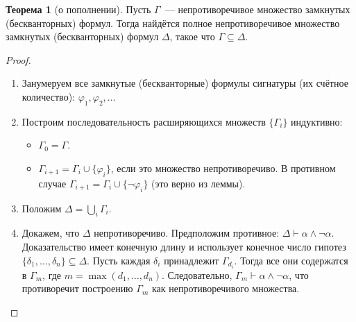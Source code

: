 \documentclass[a4paper,11pt]{article}
\theoremstyle{definition}
\newtheorem*{thm}{Теорема}
\newcommand{\proves}{\vdash}
\begin{document}
\begin{thm}[о пополнении]
Пусть $\Gamma$~--- непротиворечивое множество замкнутых (бескванторных) формул.
Тогда найдётся полное непротиворечивое множество замкнутых (бескванторных)
формул $\Delta$, такое что $\Gamma \subseteq \Delta$.
\end{thm}
\begin{proof}
\begin{enumerate}
\item Занумеруем все замкнутые (бескванторные) формулы сигнатуры (их счётное
  количество): $\varphi_1, \varphi_2, \dots$
\item Построим последовательность расширяющихся множеств $\{\Gamma_i\}$
  индуктивно:
  \begin{itemize}
  \item $\Gamma_0 = \Gamma$.
  \item $\Gamma_{i+1} = \Gamma_i \cup \{\varphi_i\}$, если это множество
    непротиворечиво. В противном случае $\Gamma_{i+1} = \Gamma_i \cup
    \{\neg\varphi_i\}$ (это верно из леммы).
  \end{itemize}
\item Положим $\Delta = \bigcup_i \Gamma_i$.
\item Докажем, что $\Delta$ непротиворечиво. Предположим противное: $\Delta
  \proves \alpha \wedge \neg\alpha$. Доказательство имеет конечную длину и
  использует конечное число гипотез $\{\delta_1, \dots, \delta_n\} \subseteq
  \Delta$. Пусть каждая $\delta_i$ принадлежит $\Gamma_{d_i}$. Тогда все они
  содержатся в $\Gamma_m$, где $m = \max(d_1, \dots, d_n)$. Следовательно,
  $\Gamma_m \proves \alpha \wedge \neg\alpha$, что противоречит построению
  $\Gamma_m$ как непротиворечивого множества.
\end{enumerate}
\end{proof}
\end{document}
